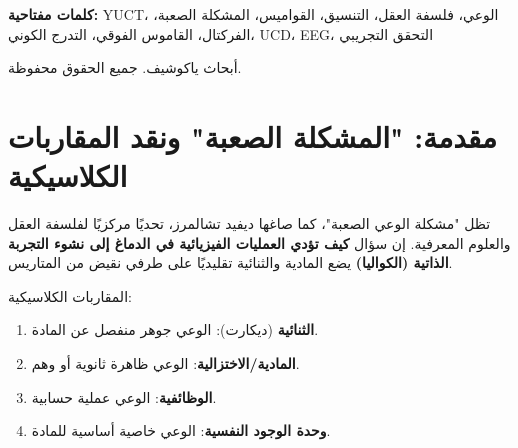 \documentclass[12pt,a4paper]{article}
\DeclareRobustCommand{\alD}{\texorpdfstring{\ensuremath{\alpha_{\mathrm{D}}}}{alpha_D}}
\DeclareRobustCommand{\beI}{\texorpdfstring{\ensuremath{\beta_{\mathrm{I}}}}{beta_I}}
\DeclareRobustCommand{\gaR}{\texorpdfstring{\ensuremath{\gamma_{\mathrm{R}}}}{gamma_R}}
\newcommand{\eff}{\mathrm{eff}}
\newcommand{\Ke}{K_{\eff}}
\begin{document}
\begin{titlepage}
\begin{center}
\begin{abstract}
				بشكل حاسم، يرتكز هذا الإطار الفلسفي الآن على القانون التجريبي الكوني \(\varepsilon = \kappa_c \alpha \Ke^{-\beta}\) مع \(\beta = 0.67\)، الذي تم التحقق منه عبر أكثر من 50 رتبة أسية (الملحق L) وتم تأكيده بشكل مستقل في ستة مجالات علمية: الفيزياء (الموجات الثقالية، GWTC-4.0)، الفيزياء الفلكية (الأقزام البيضاء، 26,041 جرمًا)، الجيوفيزياء (نظام الأرض–القمر)، الكيمياء (873 طاقة رابطة)، علم الأحياء (68 جينومًا من الفقاريات)، وعلم الأعصاب (مرتبطات EEG للوعي، معاملات UCD). على وجه الخصوص، يوفر الواصف الكوني للوعي (UCD) المقدم في الملحق H مقاييس كمية \(\alD, \beI, \gaR\) ترتبط بحالات الوعي وتتبع نفس قانون التدرج.
				
				تشمل المضامين الفلسفية: (1) طَبْعَنَة الوعي دون اختزالية؛ (2) فهم جديد لتطور العقل كنمو في تعقيد قواميس التنسيق؛ (3) إمكانية وجود أشكال غير بشرية المركز من الوعي (اصطناعية، جماعية، كوكبية)؛ (4) الارتباط بالمادة/الطاقة المظلمة كحدود للتنسيق الكوني. تقدم YUCT ليس فقط حلاً "للمشكلة الصعبة" بل منصة فلسفية موحدة للحوار بين علم الأعصاب والفيزياء والعلوم الإنسانية، وقد أصبحت الآن مدعومة تجريبيًا.
			\end{abstract}
			
			\vspace{0cm}
			
			\noindent
			\small\textbf{كلمات مفتاحية:} YUCT، الوعي، فلسفة العقل، التنسيق، القواميس، المشكلة الصعبة، الفركتال، القاموس الفوقي، التدرج الكوني، UCD، EEG، التحقق التجريبي
			
			\vspace{0.5cm}
			
			\noindent
			 أبحاث ياكوشيف. جميع الحقوق محفوظة.
		\end{center}
	\end{titlepage}
	
	\tableofcontents
	
	\newpage
	
	\section{مقدمة: "المشكلة الصعبة" ونقد المقاربات الكلاسيكية}
	
	تظل "مشكلة الوعي الصعبة"، كما صاغها ديفيد تشالمرز، تحديًا مركزيًا لفلسفة العقل والعلوم المعرفية. إن سؤال \textbf{كيف تؤدي العمليات الفيزيائية في الدماغ إلى نشوء التجربة الذاتية (الكواليا)} يضع المادية والثنائية تقليديًا على طرفي نقيض من المتاريس.
	
	المقاربات الكلاسيكية:
	\begin{enumerate}
		\item \textbf{الثنائية} (ديكارت): الوعي جوهر منفصل عن المادة.
		\item \textbf{المادية/الاختزالية}: الوعي ظاهرة ثانوية أو وهم.
		\item \textbf{الوظائفية}: الوعي عملية حسابية.
		\item \textbf{وحدة الوجود النفسية}: الوعي خاصية أساسية للمادة.
	\end{enumerate}
	
\end{document}
